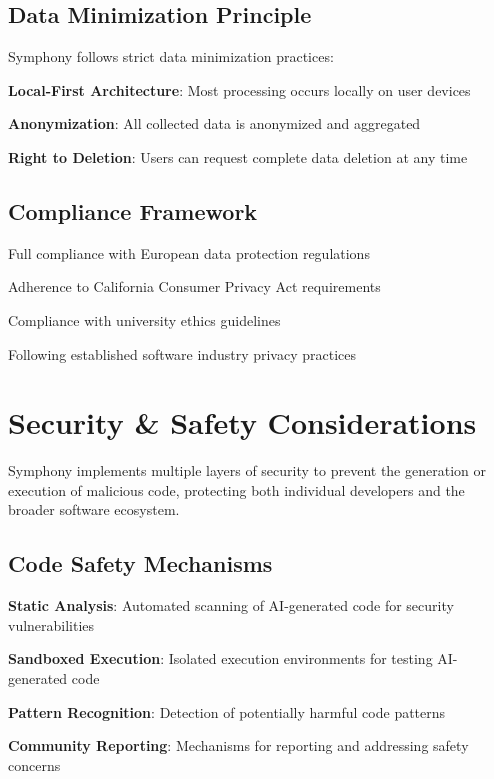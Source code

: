 \subsection*{Data Minimization Principle}
Symphony follows strict data minimization practices:

\begin{compactlist}
    \item \textbf{Local-First Architecture}: Most processing occurs locally on user devices
    \item \textbf{Anonymization}: All collected data is anonymized and aggregated
    \item \textbf{Right to Deletion}: Users can request complete data deletion at any time
\end{compactlist}

\subsection*{Compliance Framework}
\begin{description}[leftmargin=3cm,labelwidth=2.5cm]
    \item[\textbf{GDPR}] Full compliance with European data protection regulations
    \item[\textbf{CCPA}] Adherence to California Consumer Privacy Act requirements
    \item[\textbf{Academic Ethics}] Compliance with university ethics guidelines
    \item[\textbf{Industry Standards}] Following established software industry privacy practices
\end{description}

\section*{Security \& Safety Considerations}

\begin{alertbox}
Symphony implements multiple layers of security to prevent the generation or execution of malicious code, protecting both individual developers and the broader software ecosystem.
\end{alertbox}

\subsection*{Code Safety Mechanisms}
\begin{compactlist}
    \item \textbf{Static Analysis}: Automated scanning of AI-generated code for security vulnerabilities
    \item \textbf{Sandboxed Execution}: Isolated execution environments for testing AI-generated code
    \item \textbf{Pattern Recognition}: Detection of potentially harmful code patterns
    \item \textbf{Community Reporting}: Mechanisms for reporting and addressing safety concerns
\end{compactlist}

